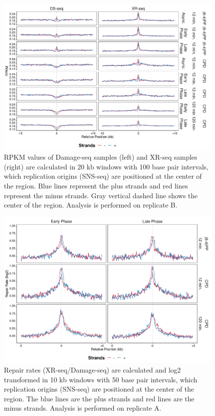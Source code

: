 \begin{figure}[H]
\begin{center}
\includegraphics[width=\textwidth]{Chapters/7_appendix/figures/supfig49}
\caption[Damage and repair events of replication origins in 20 kb (replicate B).]{RPKM values of Damage-seq samples (left) and XR-seq samples (right) are calculated in 20 kb windows with 100 base pair intervals, which replication origins (SNS-seq) are positioned at the center of the region. Blue lines represent the plus strands and red lines represent the minus strands. Gray vertical dashed line shows the center of the region. Analysis is performed on replicate B.}
\label{supfig:rpkm20snsB}
\end{center}
\end{figure}

\begin{figure}[H]
\begin{center}
\includegraphics[width=\textwidth]{Chapters/7_appendix/figures/supfig50}
\caption[Repair rate of replication origins in 10 kb (replicate A).]{Repair rates (XR-seq/Damage-seq) are calculated and log2 transformed in 10 kb windows with 50 base pair intervals, which replication origins (SNS-seq) are positioned at the center of the region. The blue lines are the plus strands and red lines are the minus strands. Analysis is performed on replicate A.}
\label{supfig:rr10snsA}
\end{center}
\end{figure}

